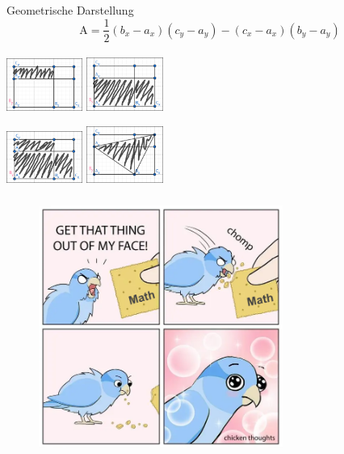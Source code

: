 \documentclass{beamer}
\begin{document}
\begin{frame}
\frametitle{\phantom{}}
\small
Geometrische Darstellung
\[
\text{A} = \frac{1}{2}(b_{x} - a_{x})(c_{y} - a_{y}) - (c_{x} - a_{x})(b_{y} - a_{y})
\] \\
\centering
\includegraphics[width=2.5cm]{bilder/geo1.png}
\hspace{2mm}
\includegraphics[width=2.5cm]{bilder/geo2.png}

\includegraphics[width=2.5cm]{bilder/geo3.png}
\hspace{2mm}
\includegraphics[width=2.5cm]{bilder/geo5.png}
\end{frame}

\begin{frame}
	\frametitle{\phantom{}}	
	\begin{figure}
		\centering
		\includegraphics[width=8cm]{bilder/chicken.png}
	\end{figure}
\end{frame}
\end{document}

